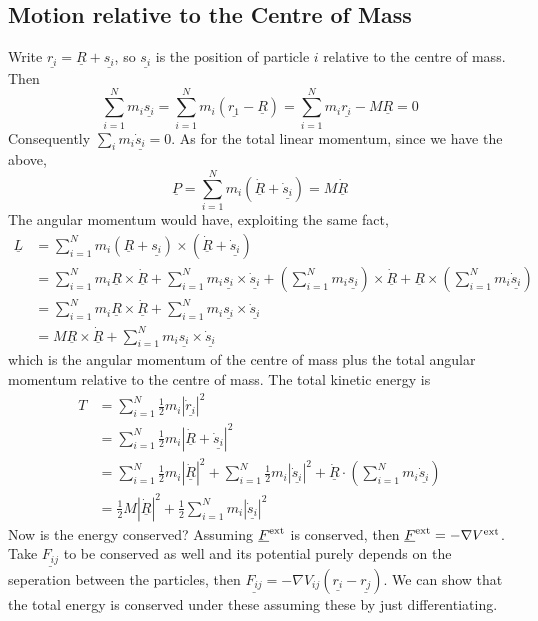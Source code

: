 \subsection{Motion relative to the Centre of Mass}
Write $\underline{r_i}=\underline{R}+\underline{s_i}$, so $\underline{s_i}$ is the position of particle $i$ relative to the centre of mass.
Then
$$\sum_{i=1}^Nm_i\underline{s_i}=\sum_{i=1}^Nm_i(\underline{r_1}-\underline{R})=\sum_{i=1}^Nm_i\underline{r_i}-M\underline{R}=0$$
Consequently $\sum_im_i\underline{\dot{s}_i}=0$.
As for the total linear momentum, since we have the above,
$$\underline{P}=\sum_{i=1}^Nm_i(\underline{\dot{R}}+\underline{\dot{s}_i})=M\underline{\dot{R}}$$
The angular momentum would have, exploiting the same fact,
\begin{align*}
    \underline{L}&=\sum_{i=1}^Nm_i(\underline{R}+\underline{s_i})\times(\underline{\dot{R}}+\underline{\dot{s}_i})\\
    &=\sum_{i=1}^Nm_i\underline{R}\times\underline{\dot{R}}+\sum_{i=1}^Nm_i\underline{s_i}\times\underline{\dot{s}_i}+\left( \sum_{i=1}^Nm_i\underline{s_i} \right)\times\underline{\dot{R}}+\underline{R}\times\left( \sum_{i=1}^Nm_i\underline{\dot{s}_i} \right)\\
    &=\sum_{i=1}^Nm_i\underline{R}\times\underline{\dot{R}}+\sum_{i=1}^Nm_i\underline{s_i}\times\underline{\dot{s}_i}\\
    &=M\underline{R}\times\underline{\dot{R}}+\sum_{i=1}^Nm_i\underline{s_i}\times\underline{\dot{s}_i}
\end{align*}
which is the angular momentum of the centre of mass plus the total angular momentum relative to the centre of mass.
The total kinetic energy is
\begin{align*}
    T&=\sum_{i=1}^N\frac{1}{2}m_i|\underline{\dot{r}_i}|^2\\
    &=\sum_{i=1}^N\frac{1}{2}m_i|\underline{\dot{R}}+\underline{\dot{s}_i}|^2\\
    &=\sum_{i=1}^N\frac{1}{2}m_i|\underline{\dot{R}}|^2+\sum_{i=1}^N\frac{1}{2}m_i|\underline{\dot{s}_i}|^2+\underline{\dot{R}}\cdot\left(\sum_{i=1}^Nm_i\underline{\dot{s}_i}\right)\\
    &=\frac{1}{2}M|\underline{\dot{R}}|^2+\frac{1}{2}\sum_{i=1}^Nm_i|\underline{\dot{s}_i}|^2
\end{align*}
Now is the energy conserved?
Assuming $\underline{F}^{\rm ext}$ is conserved, then $\underline{F}^{\rm ext}=-\nabla V^{\rm ext}$.
Take $\underline{F_{ij}}$ to be conserved as well and its potential purely depends on the seperation between the particles, then $\underline{F_{ij}}=-\nabla V_{ij}(\underline{r_i}-\underline{r_j})$.
We can show that the total energy is conserved under these assuming these by just differentiating.
